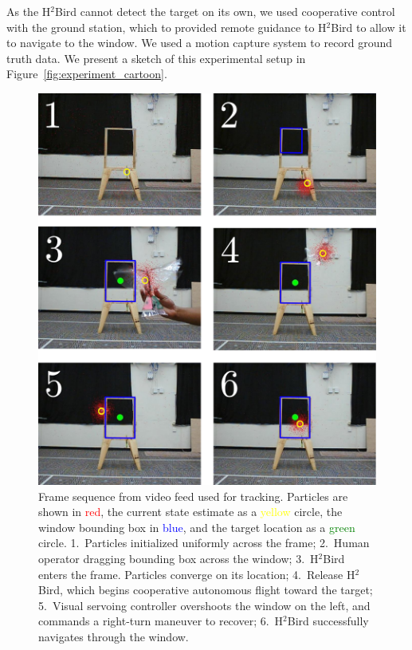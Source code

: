 \documentclass{aamas2013}
\begin{document}
As the H$^2$Bird cannot detect the target on its own, we used cooperative 
control with the ground station, which to provided remote guidance to 
H$^2$Bird to allow it to navigate to the window. We used a motion capture 
system to record ground truth data. We present a sketch of this experimental 
setup in Figure~\ref{fig:experiment_cartoon}.

\begin{figure}[tb]
\centering
\includegraphics[width=\linewidth]{figures/pf_screencap.pdf}
\caption{Frame sequence from video feed used for tracking. Particles 
are shown in \textcolor{red}{red}, the current state estimate as a 
\textcolor{yellow}{yellow} circle, the window bounding box in
\textcolor{blue}{blue}, and the target location as a \textcolor{green}{green} 
circle. 1.~Particles initialized uniformly across the frame; 2.~Human operator 
dragging bounding box across the window; 3.~H$^2$Bird enters the frame. 
Particles converge on its location; 4.~Release H$^2$Bird, which 
begins cooperative autonomous flight toward the target; 5.~Visual servoing 
controller overshoots the window on the left, and commands a right-turn 
maneuver to recover; 6.~H$^2$Bird successfully navigates through the window.}
\label{fig:pf_screencap}
\end{figure}
\end{document}
